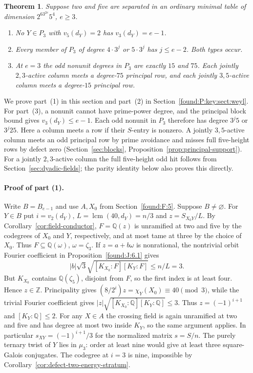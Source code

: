 \documentclass[11pt,a4paper]{article}
\numberwithin{equation}{section}
\newtheorem{theorem}{Theorem}[section]
\theoremstyle{remark}
\newcommand{\ZZ}{\mathbb Z}
\newcommand{\QQ}{\mathbb Q}
\begin{document}
\begin{theorem}\label{found:P:1.1}\label{found:P:key:thm:main}
Suppose two and five are separated in an ordinary minimal table of dimension $2^63^{2e}5^4$, $e\ge3$.
\begin{enumerate}
\item No $Y\in P_3$ with $v_5(d_Y)=2$ has $v_3(d_Y)=e-1$.
\item Every member of $P_3$ of degree $4\cdot3^j$ or $5\cdot3^j$ has $j\le e-2$. Both types occur.
\item At $e=3$ the odd nonunit degrees in $P_3$ are exactly $15$ and $75$. Each jointly $2,3$-active column meets a degree-$75$ principal row, and each jointly $3,5$-active column meets a degree-$15$ principal row.
\end{enumerate}
\end{theorem}
We prove part~(1) in this section and part~(2) in Section~\ref{found:P:key:sect:weyl}. For part~(3), a nonunit cannot have prime-power degree, and the principal block bound gives $v_3(d_Y)\le e-1$. Each odd nonunit in $P_3$ therefore has degree $3^j5$ or $3^j25$. Here a column meets a row if their $S$-entry is nonzero. A jointly $3,5$-active column meets an odd principal row by prime avoidance and misses full five-height rows by defect zero (Section~\ref{sec:blocks}, Proposition~\ref{prop:principal-support}). For a jointly $2,3$-active column the full five-height odd hit follows from Section~\ref{sec:dyadic-fields}; the parity identity below also proves this directly.
\paragraph{Proof of part (1).}

Write $B=B_{e-1}$ and use $A,X_0$ from Section~\ref{found:F:5}.
Suppose $B\ne\varnothing$. For $Y\in B$ put $i=v_2(d_Y)$,
$L=\operatorname{lcm}(40,d_Y)=n/3$ and $z=S_{X_0Y}/L$.
By Corollary~\ref{cor:field-conductor}, $F=\QQ(z)$ is unramified at
two and five by the codegrees of $X_0$ and $Y$, respectively, and
at most tame at three by the choice of $X_0$. Thus $F\subseteq\QQ(\omega)$,
$\omega=\zeta_3$. If $z=a+b\omega$ is nonrational, the nontrivial
orbit Fourier coefficient in Proposition~\ref{found:J:6.1} gives
\[
 |b|\sqrt3\sqrt{[K_{X_0}:F][K_Y:F]}\le n/L=3.
\]
But $K_{X_0}$ contains $\QQ(\zeta_5)$, disjoint from $F$, so the
first index is at least four. Hence $z\in\ZZ$. Principality gives
$(8/2^i)z=\chi_Y(X_0)\equiv40\pmod3$, while the trivial Fourier
coefficient gives $|z|\sqrt{[K_{X_0}:\QQ][K_Y:\QQ]}\le3$. Thus
$z=(-1)^{i+1}$ and $[K_Y:\QQ]\le2$. For any $X\in A$ the crossing
field is again unramified at two and five and has degree at most
two inside $K_Y$, so the same argument applies. In particular
$s_{XY}=(-1)^{i+1}/3$ for the normalized matrix $s=S/n$.
The purely ternary twist of $Y$ lies in $\mu_3$: order at least
nine would give at least three square-Galois conjugates.
The codegree at $i=3$ is nine, impossible by
Corollary~\ref{cor:defect-two-energy-stratum}.
\end{document}
